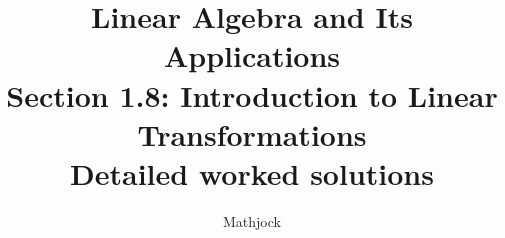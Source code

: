 
\title{\textbf{Linear Algebra and Its Applications}\\[0.3em]Section 1.8: Introduction to Linear Transformations\\[0.3em]\large Detailed worked solutions}
\author{Mathjock}
\date{}

\maketitle
\bookinfo
\tableofcontents
\clearpage
\renewcommand{\thesection}{1.\arabic{section}}
\renewcommand{\theHsection}{1.\arabic{section}}
\setcounter{section}{7}


